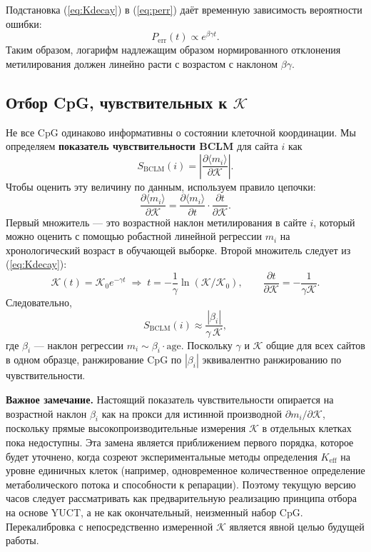 \documentclass[12pt,a4paper]{article}
\newcommand{\REL}{\mathcal{K}}          %
\begin{document}
	Подстановка (\ref{eq:Kdecay}) в (\ref{eq:perr}) даёт временную зависимость вероятности ошибки:
	\[
	P_{\mathrm{err}}(t) \propto e^{\beta\gamma t}.
	\]
	Таким образом, логарифм надлежащим образом нормированного отклонения метилирования должен линейно расти с возрастом с наклоном \(\beta\gamma\).
	
	\subsection{Отбор CpG, чувствительных к \(\REL\)}
	Не все CpG одинаково информативны о состоянии клеточной координации. Мы определяем \textbf{показатель чувствительности BCLM} для сайта \(i\) как
	\begin{equation}
		S_{\mathrm{BCLM}}(i) = \left| \frac{\partial \langle m_i \rangle}{\partial \REL} \right|.
		\label{eq:sensitivity}
	\end{equation}
	Чтобы оценить эту величину по данным, используем правило цепочки:
	\[
	\frac{\partial \langle m_i \rangle}{\partial \REL} = \frac{\partial \langle m_i \rangle}{\partial t} \cdot \frac{\partial t}{\partial \REL}.
	\]
	Первый множитель — это возрастной наклон метилирования в сайте \(i\), который можно оценить с помощью робастной линейной регрессии \(m_i\) на хронологический возраст в обучающей выборке. Второй множитель следует из (\ref{eq:Kdecay}):
	\[
	\REL(t) = \REL_0 e^{-\gamma t} \;\Longrightarrow\; t = -\frac{1}{\gamma}\ln(\REL/\REL_0),\qquad
	\frac{\partial t}{\partial \REL} = -\frac{1}{\gamma \REL}.
	\]
	Следовательно,
	\[
	S_{\mathrm{BCLM}}(i) \approx \frac{|\beta_i|}{\gamma \, \REL},
	\]
	где \(\beta_i\) — наклон регрессии \(m_i \sim \beta_i \cdot \text{age}\). Поскольку \(\gamma\) и \(\REL\) общие для всех сайтов в одном образце, ранжирование CpG по \(|\beta_i|\) эквивалентно ранжированию по чувствительности.
	
	\textbf{Важное замечание.}
	Настоящий показатель чувствительности опирается на возрастной наклон \(\beta_i\) как на прокси для истинной производной \(\partial m_i/\partial \REL\), поскольку прямые высокопроизводительные измерения \(\REL\) в отдельных клетках пока недоступны.
	Эта замена является приближением первого порядка, которое будет уточнено, когда созреют экспериментальные методы определения \(K_{\mathrm{eff}}\) на уровне единичных клеток (например, одновременное количественное определение метаболического потока и способности к репарации).
	Поэтому текущую версию часов следует рассматривать как предварительную реализацию принципа отбора на основе YUCT, а не как окончательный, неизменный набор CpG.
	Перекалибровка с непосредственно измеренной \(\REL\) является явной целью будущей работы.
	
\end{document}
